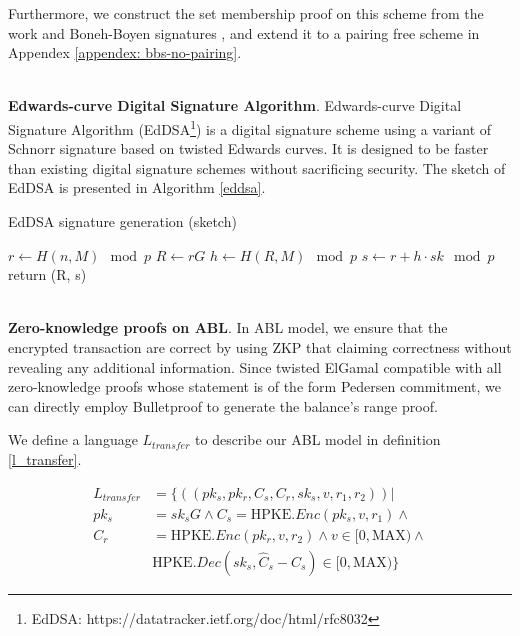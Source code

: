 \documentclass{article}
\begin{document}
Furthermore, we construct the set membership proof on this scheme from the work \cite{camenisch2008efficient} and Boneh-Boyen signatures \cite{jao2009boneh}, and extend it to a pairing free scheme in Appendex \ref{appendex: bbs-no-pairing}.

~\\
\noindent\textbf{Edwards-curve Digital Signature Algorithm}. Edwards-curve Digital Signature Algorithm (EdDSA\footnote{EdDSA: https://datatracker.ietf.org/doc/html/rfc8032}) is a digital signature scheme using a variant of Schnorr signature based on twisted Edwards curves. It is designed to be faster than existing digital signature schemes without sacrificing security. The sketch of EdDSA is presented in Algorithm \ref{eddsa}.

\begin{algorithm}
 \caption{EdDSA signature generation (sketch)}
 \label{eddsa}
 \LinesNumbered
 
 $r \gets H(n, M) \mod{p}$ \;
 $R \gets rG$ \;
 $h \gets H(R, M) \mod{p}$ \;
 $s \gets r + h \cdot sk \mod{p}$ \;
  return (R, s)
\end{algorithm}

~\\
\noindent\textbf{Zero-knowledge proofs on ABL}. In ABL model, we ensure that the encrypted transaction are correct by using ZKP that claiming correctness without revealing any additional information. Since twisted ElGamal compatible with all zero-knowledge proofs whose statement is of the form Pedersen commitment, we can directly employ Bulletproof to generate the balance's range proof. 

We define a language $L_{transfer}$ to describe our ABL model in definition \ref{l_transfer}.

\begin{equation}\label{l_transfer}
\begin{aligned}
    L_{transfer} &= \{((pk_s, pk_r, C_s, C_r, sk_s, v, r_1, r_2)) | \\ 
        pk_s &= sk_sG \land C_s = \mbox{HPKE}.Enc(pk_s,v, r_1) \land \\
        C_r &=  \mbox{HPKE}.Enc(pk_r,v, r_2) \land v \in [0, \mbox{MAX}) \land \\
        &\mbox{HPKE}.Dec(sk_s, \hat{C}_s - C_s) \in [0, \mbox{MAX})\}
\end{aligned}
\end{equation}
\end{document}
